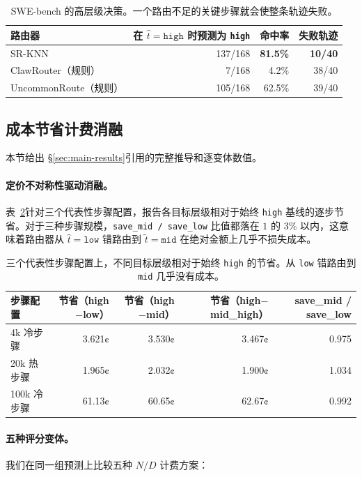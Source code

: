 \begin{table}[ht]
\centering
\small
\begin{tabular}{lrrr}
\toprule
路由器 & 在 $\hat{t}=\texttt{high}$ 时预测为 \texttt{high} & 命中率 & 失败轨迹 \\
\midrule
SR-KNN       & 137/168 & \textbf{81.5\%} & \textbf{10/40} \\
ClawRouter（规则） & 7/168   & 4.2\%  & 38/40 \\
UncommonRoute（规则） & 105/168 & 62.5\% & 39/40 \\
\bottomrule
\end{tabular}
\caption{SWE-bench 的高层级决策。一个路由不足的关键步骤就会使整条轨迹失败。}
\label{tab:swe-high}
\end{table}

\subsection{成本节省计费消融}
\label{app:cost-ablation}

本节给出 \S\ref{sec:main-results}引用的完整推导和逐变体数值。

\paragraph{定价不对称性驱动消融。}
表~\ref{tab:save-asymmetry}针对三个代表性步骤配置，报告各目标层级相对于始终 \texttt{high} 基线的逐步节省。对于三种步骤规模，\texttt{save\_mid / save\_low} 比值都落在 $1$ 的 3\% 以内，这意味着路由器从 $\hat{t}=\texttt{low}$ 错路由到 $\tilde{t}=\texttt{mid}$ 在绝对金额上几乎不损失成本。

\begin{table}[ht]
\centering
\small
\caption{三个代表性步骤配置上，不同目标层级相对于始终 \texttt{high} 的节省。从 \texttt{low} 错路由到 \texttt{mid} 几乎没有成本。}
\label{tab:save-asymmetry}
\begin{tabular}{lrrrr}
\toprule
步骤配置 & 节省（high$-$low） & 节省（high$-$mid） & 节省（high$-$mid\_high） & save\_mid / save\_low \\
\midrule
4k 冷步骤     & 3.621¢ & 3.530¢ & 3.467¢ & 0.975 \\
20k 热步骤    & 1.965¢ & 2.032¢ & 1.900¢ & 1.034 \\
100k 冷步骤   & 61.13¢ & 60.65¢ & 62.67¢ & 0.992 \\
\bottomrule
\end{tabular}
\end{table}

\paragraph{五种评分变体。}
我们在同一组预测上比较五种 $N/D$ 计费方案：

